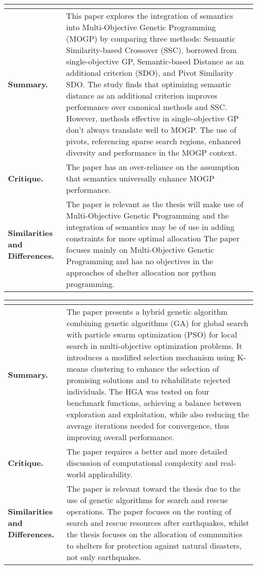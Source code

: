 \begin{longtable}{|L{.2\linewidth}|L{.74\linewidth}|}
	\hline
	\\ \hline
	\textbf{Summary.} & This paper explores the integration of semantics into Multi-Objective Genetic Programming (MOGP) by comparing three methods: Semantic Similarity-based Crossover (SSC), borrowed from single-objective GP, Semantic-based Distance as an additional criterion (SDO), and Pivot Similarity SDO. The study finds that optimizing semantic distance as an additional criterion improves performance over canonical methods and SSC. However, methods effective in single-objective GP don't always translate well to MOGP. The use of pivots, referencing sparse search regions, enhanced diversity and performance in the MOGP context.\\ \hline
	\textbf{Critique.} & The paper has an over-reliance on the assumption that semantics universally enhance MOGP performance.\\ \hline
	\textbf{Similarities and Differences.} & The paper is relevant as the thesis will make use of Multi-Objective Genetic Programming and the integration of semantics may be of use in adding constraints for more optimal allocation	The paper focuses mainly on Multi-Objective Genetic Programming and has no objectives in the approaches of shelter allocation nor python programming.\\ \hline
\end{longtable}

\begin{longtable}{|L{.2\linewidth}|L{.74\linewidth}|}
	\hline
	\\ \hline
	\textbf{Summary.} & The paper presents a hybrid genetic algorithm combining genetic algorithms (GA) for global search with particle swarm optimization (PSO) for local search in multi-objective optimization problems. It introduces a modified selection mechanism using K-means clustering to enhance the selection of promising solutions and to rehabilitate rejected individuals. The HGA was tested on four benchmark functions, achieving a balance between exploration and exploitation, while also reducing the average iterations needed for convergence, thus improving overall performance.\\ \hline
	\textbf{Critique.} & The paper requires a better and more detailed discussion of computational complexity and real-world applicability.\\ \hline
	\textbf{Similarities and Differences.} & The paper is relevant toward the thesis due to the use of genetic algorithms for search and rescue operations.	The paper focuses on the routing of search and rescue resources after earthquakes, whilst the thesis focuses on the allocation of communities to shelters for protection against natural disasters, not only earthquakes.\\ \hline
\end{longtable}

